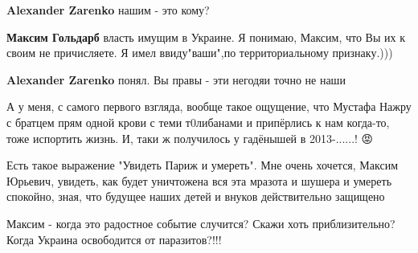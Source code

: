 \begin{itemize}
\begin{itemize}
\textbf{Alexander Zarenko} нашим - это кому?

 
\textbf{Максим Гольдарб} власть имущим в Украине. Я понимаю, Максим, что Вы их к своим не причисляете. Я имел ввиду"ваши",по территориальному признаку.)))

 
\textbf{Alexander Zarenko} понял. Вы правы - эти негодяи точно не наши
\end{itemize}


А у меня, с самого первого взгляда, вообще такое ощущение, что Мустафа Нажру с
братцем прям одной крови с теми т0либанами и припёрлись к нам когда-то, тоже
испортить жизнь. И, таки ж получилось у гадёнышей в 2013-......! 😡


 

Есть такое выражение "Увидеть Париж и умереть". Мне очень хочется, Максим
Юрьевич, увидеть, как будет уничтожена вся эта мразота и шушера и умереть
спокойно, зная, что будущее наших детей и внуков действительно защищено


 
Максим - когда это радостное событие случится? Скажи хоть приблизительно? Когда Украина освободится от паразитов?!!!

\end{itemize}

